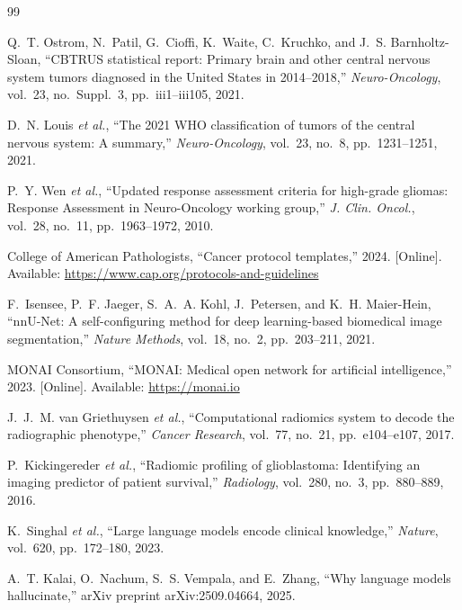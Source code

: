 \documentclass[journal]{IEEEtran}
\begin{document}

\begin{thebibliography}{99}

Q.~T. Ostrom, N.~Patil, G.~Cioffi, K.~Waite, C.~Kruchko, and
J.~S. Barnholtz-Sloan, ``CBTRUS statistical report: Primary brain and other
central nervous system tumors diagnosed in the United States in 2014--2018,''
\textit{Neuro-Oncology}, vol.~23, no.~Suppl.~3, pp.~iii1--iii105, 2021.

D.~N. Louis \textit{et al.}, ``The 2021 WHO classification of tumors of
the central nervous system: A summary,'' \textit{Neuro-Oncology}, vol.~23,
no.~8, pp.~1231--1251, 2021.

P.~Y. Wen \textit{et al.}, ``Updated response assessment criteria for
high-grade gliomas: Response Assessment in Neuro-Oncology working group,''
\textit{J. Clin. Oncol.}, vol.~28, no.~11, pp.~1963--1972, 2010.

College of American Pathologists, ``Cancer protocol templates,'' 2024.
[Online]. Available: \url{https://www.cap.org/protocols-and-guidelines}

F.~Isensee, P.~F. Jaeger, S.~A.~A. Kohl, J.~Petersen, and
K.~H. Maier-Hein, ``nnU-Net: A self-configuring method for deep
learning-based biomedical image segmentation,'' \textit{Nature Methods},
vol.~18, no.~2, pp.~203--211, 2021.

MONAI Consortium, ``MONAI: Medical open network for artificial
intelligence,'' 2023. [Online]. Available: \url{https://monai.io}

J.~J.~M. van Griethuysen \textit{et al.}, ``Computational radiomics system
to decode the radiographic phenotype,'' \textit{Cancer Research}, vol.~77,
no.~21, pp.~e104--e107, 2017.

P.~Kickingereder \textit{et al.}, ``Radiomic profiling of glioblastoma:
Identifying an imaging predictor of patient survival,'' \textit{Radiology},
vol.~280, no.~3, pp.~880--889, 2016.

K.~Singhal \textit{et al.}, ``Large language models encode clinical
knowledge,'' \textit{Nature}, vol.~620, pp.~172--180, 2023.

A.~T. Kalai, O.~Nachum, S.~S. Vempala, and E.~Zhang, ``Why language
models hallucinate,'' arXiv preprint arXiv:2509.04664, 2025.


\end{thebibliography}
\end{document}
